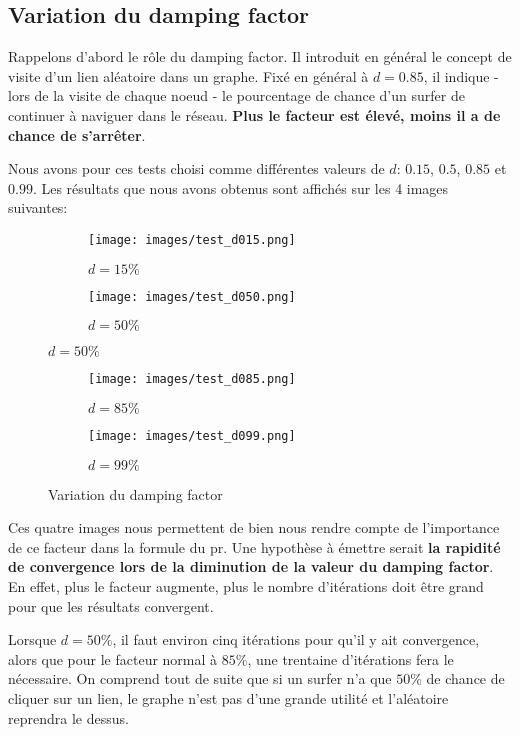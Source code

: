 \documentclass[12pt,twoside, openright]{memoir}
\begin{document}
	\subsection{Variation du damping factor}
	Rappelons d'abord le rôle du damping factor. Il introduit en général le concept de visite d'un lien aléatoire dans un graphe. Fixé en général à $d=0.85$, il indique - lors de la visite de chaque noeud - le pourcentage de chance d'un surfer de continuer à naviguer dans le réseau. \textbf{Plus le facteur est élevé, moins il a de chance de s'arrêter}.\par
	Nous avons pour ces tests choisi comme différentes valeurs de $d$: $0.15$, $0.5$, $0.85$ et $0.99$. Les résultats que nous avons obtenus sont affichés sur les 4 images suivantes:
	\begin{figure}[ht]
		\begin{subfigure}[b]{.5\linewidth}
			\centering
			\texttt{[image: images/test\_d015.png]} 
			\caption{$d=15\%$} 
			\label{df_tests:fifteen}
		\end{subfigure}%
		\begin{subfigure}[b]{.5\linewidth}
			\centering
			\texttt{[image: images/test\_d050.png]} 
			\caption{$d=50\%$} 
			\label{df_tests:fifty}
		\end{subfigure}
	\end{figure}
	\begin{figure}\ContinuedFloat
		\begin{subfigure}[b]{.5\linewidth}
			\centering
			\texttt{[image: images/test\_d085.png]} 
			\caption{$d=85\%$} 
			\label{df_tests:eigthy_five}
		\end{subfigure}%
		\begin{subfigure}[b]{.5\linewidth}
			\centering
			\texttt{[image: images/test\_d099.png]} 
			\caption{$d=99\%$} 
			\label{df_tests:ninety_nine}
		\end{subfigure}
		\caption{Variation du damping factor}
		\label{df_tests} 
	\end{figure}\par
	Ces quatre images nous permettent de bien nous rendre compte de l'importance de ce facteur dans la formule du \gls{pr}. Une hypothèse à émettre serait \textbf{la rapidité de convergence lors de la diminution de la valeur du damping factor}. En effet, plus le facteur augmente, plus le nombre d'itérations doit être grand pour que les résultats convergent.\par
	Lorsque $d=50\%$, il faut environ cinq itérations pour qu'il y ait convergence, alors que pour le facteur normal à $85\%$, une trentaine d'itérations fera le nécessaire. On comprend tout de suite que si un surfer n'a que $50\%$ de chance de cliquer sur un lien, le graphe n'est pas d'une grande utilité et l'aléatoire reprendra le dessus.
\end{document}
